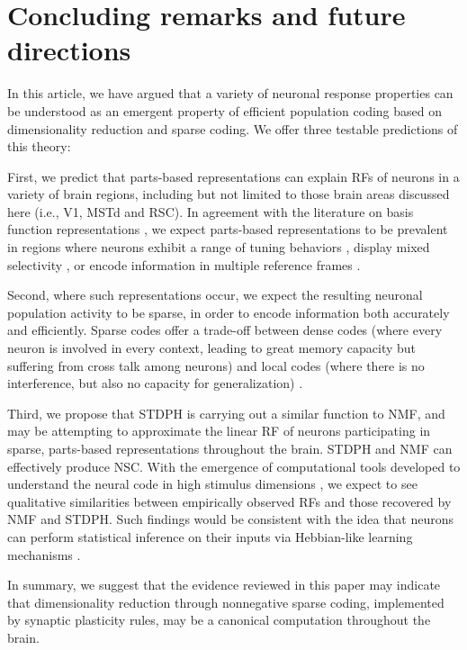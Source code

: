 \section{Concluding remarks and future directions}
\label{sec:conclusion}

In this article,
we have argued that a variety of neuronal response properties can
be understood as an emergent property of efficient population coding
based on dimensionality reduction and sparse coding.
We offer three testable predictions of this theory:

First, we predict that parts-based representations can explain
\acp{RF} of neurons in a variety of brain regions,
including but not limited to those brain areas discussed here (i.e., V1, MSTd and RSC). In agreement with the literature on basis function representations
\citep{PougetSejnowski1997,PougetSnyder2000,Poggio1990},
we expect parts-based representations
to be prevalent in regions where neurons
exhibit a range of tuning behaviors \citep{Beyeler2016},
display mixed selectivity \citep{Fusi2016,Eichenbaum2017},
or encode information in multiple reference frames \citep{AlexanderNitz2015,Rounds2016}.

Second, where such representations occur, we expect the resulting
neuronal population activity to be sparse,
in order to encode information both accurately and efficiently.
Sparse codes offer a trade-off between 
dense codes (where every neuron is involved in every context,
leading to great memory capacity but suffering from cross talk among neurons)
and local codes (where there is no interference, 
but also no capacity for generalization) \citep{Spanne2015417}.

Third, we propose that \ac{STDPH} is carrying out a similar function to \ac{NMF},
and may be attempting to approximate the linear \ac{RF} of
neurons participating in sparse, parts-based representations
throughout the brain. STDPH and NMF can effectively produce NSC.
With the emergence of computational tools developed
to understand the neural code 
in high stimulus dimensions \citep{PillowSimoncelli2006},
we expect to see qualitative similarities between empirically observed
\acp{RF} and those recovered by \ac{NMF} and \ac{STDPH}.
Such findings would be consistent with the idea that neurons
can perform statistical inference on their inputs via
Hebbian-like learning mechanisms
\citep{Nessler2009,Carlson2013,MorenoBoteDrugowitsch2015,Oja1982}.

In summary, we suggest that the evidence reviewed in this paper may indicate that dimensionality reduction through nonnegative sparse coding, implemented by synaptic plasticity rules, may be a canonical computation throughout the brain. 


